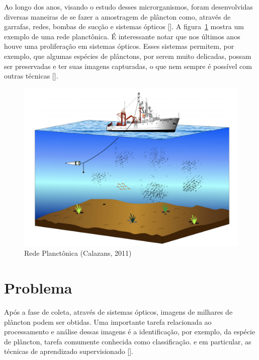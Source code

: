 Ao longo dos anos, visando o estudo desses microrganismos, foram desenvolvidas diversas maneiras de se fazer a amostragem de plâncton como, através de garrafas, redes, bombas de sucção e sistemas ópticos [\cite{calazans2011organismos}]. A figura~\ref{fig:amostragem_planctons} mostra um exemplo de uma rede planctônica. É interessante notar que nos últimos anos houve uma proliferação em sistemas ópticos. Esses sistemas permitem, por exemplo, que algumas espécies de plânctons, por serem muito delicadas, possam ser preservadas e ter suas imagens capturadas, o que nem sempre é possível com outras técnicas [\cite{benfield2007rapid}].


\begin{figure}
  \centering
  \includegraphics[width=.8\textwidth]{figures/amostragem_planctons.png}
  \caption{Rede Planctônica (Calazans, 2011)}
  \label{fig:amostragem_planctons}
\end{figure}


\section{Problema}
\label{sec:intro_problema}

Após a fase de coleta, através de sistemas ópticos, imagens de milhares de plâncton podem ser obtidas. Uma importante tarefa relacionada ao processamento e análise dessas imagens é a identificação, por exemplo, da espécie de plâncton, tarefa comumente conhecida como classificação.  e em particular, as técnicas de aprendizado supervisionado [\cite{jeffries1980computer, jeffries1984automated, berman1990image, tang1998automatic, luo2003learning, davis2004real, grosjean2004enumeration, luo2005active, hu2005automatic, blaschko2005automatic, hu2006accurate, sosik2007automated, bell2008assessment, soh2008segmentation, al2016plankton, luo2017automated, al2018intelligent}].


